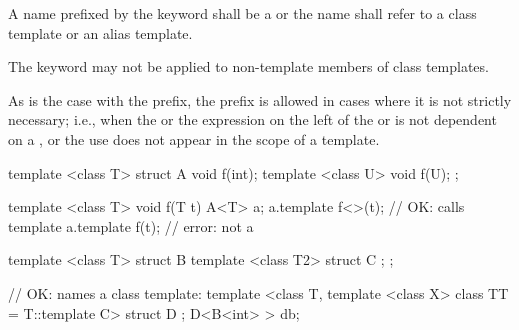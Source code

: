 \pnum
A name prefixed by the keyword
shall be a  or
the name shall refer to a class template or an alias template.
\begin{note}
The keyword
may not be applied to non-template members of class templates.
\end{note}
\begin{note}
As is the case with the
prefix, the
prefix is allowed in cases where it is not strictly
necessary; i.e., when the  or
the expression on the left of
the
\tcode{->}
or
is not dependent on a
, or the use does not appear in the
scope of a template.
\end{note}
\begin{example}
\begin{codeblock}
template <class T> struct A {
  void f(int);
  template <class U> void f(U);
};

template <class T> void f(T t) {
  A<T> a;
  a.template f<>(t);                    // OK: calls template
  a.template f(t);                      // error: not a 
}

template <class T> struct B {
  template <class T2> struct C { };
};

// OK:  names a class template:
template <class T, template <class X> class TT = T::template C> struct D { };
D<B<int> > db;
\end{codeblock}
\end{example}

